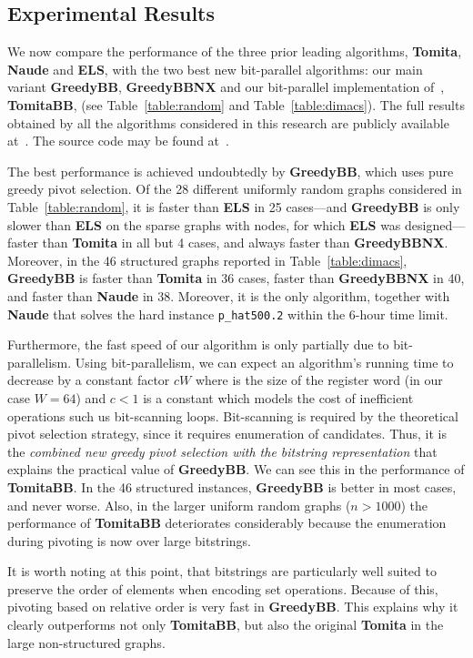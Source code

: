 \documentclass[final,1p]{elsarticle-modified}
\newcommand{\alg}[1]{\textbf{#1}}
\newcommand{\dataset}[1]{\texttt{#1}}
\begin{document}
\subsection{Experimental Results}
We now compare the performance of the three prior leading algorithms, \alg{Tomita}, \alg{Naude} and \alg{ELS}, with the two best new bit-parallel algorithms: our main variant \alg{GreedyBB}, \alg{GreedyBBNX} and our bit-parallel implementation of~\cite{tomita-2006}, \alg{TomitaBB}, (see Table~\ref{table:random} and Table~\ref{table:dimacs}). The full results obtained by all the algorithms considered in this research are publicly available at~\cite{enum-results}. The source code may be found at~\cite{enum-code}.


The best performance is achieved undoubtedly by \alg{GreedyBB}, which uses pure greedy pivot selection. Of the 28 different uniformly random graphs considered in Table~\ref{table:random}, it is faster than \alg{ELS} in 25 cases---and \alg{GreedyBB} is only slower than \alg{ELS} on the sparse graphs with  nodes, for which \alg{ELS} was designed---faster than \alg{Tomita} in all but 4 cases, and always faster than \alg{GreedyBBNX}. Moreover, in the 46 structured graphs reported in Table~\ref{table:dimacs}, \alg{GreedyBB} is faster than \alg{Tomita} in 36 cases, faster than \alg{GreedyBBNX} in 40, and faster than \alg{Naude} in 38. Moreover, it is the only algorithm, together with \alg{Naude} that solves the hard instance \dataset{p\_hat500.2} within the 6-hour time limit.

Furthermore, the fast speed of our algorithm is only partially due to bit-parallelism. Using bit-parallelism, we can expect an algorithm's running time to decrease by a constant factor $cW$ where is the size of the register word (in our case $W=64$) and $c<1$ is a constant which models the cost of inefficient operations such us bit-scanning loops. Bit-scanning is required by the theoretical pivot selection strategy, since it requires enumeration of candidates. Thus, it is the \emph{combined new greedy pivot selection with the bitstring representation} that explains the practical value of \alg{GreedyBB}. We can see this in the performance of \alg{TomitaBB}. In the 46 structured instances, \alg{GreedyBB} is better in most cases, and never worse. Also, in the larger uniform random graphs ($n>1000$) the performance of \alg{TomitaBB} deteriorates considerably because the enumeration during pivoting is now over large bitstrings.

It is worth noting at this point, that bitstrings are particularly well suited to preserve the order of elements when encoding set operations. Because of this, pivoting based on relative order is very fast in \alg{GreedyBB}. This explains why it clearly outperforms not only \alg{TomitaBB}, but also the original \alg{Tomita} in the large non-structured graphs. 
\end{document}
